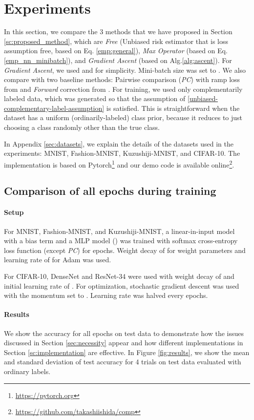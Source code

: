 \documentclass{article}
\begin{document}
\section{Experiments}
\label{sc:experiments}
In this section, we compare the 3 methods that we have proposed in Section \ref{sc:proposed_method}, which are \emph{Free} (Unbiased risk estimator that is loss assumption free, based on Eq. \eqref{emp:general}), \emph{Max Operator} (based on Eq. \eqref{emp_nn_minibatch}), and \emph{Gradient Ascent} (based on Alg.\ref{alg:ascent}).
For \emph{Gradient Ascent}, we used  and  for simplicity.
Mini-batch size was set to .
We also compare with two baseline methods: Pairwise comparison (\emph{PC}) with ramp loss from \citet{ishida17nips} and \emph{Forward} correction from \citet{yu17eccv}.
For training, we used only complementarily labeled data, which was generated so that the assumption of \eqref{unbiased-complementary-label-assumption} is satisfied.
This is straightforward when the dataset has a uniform (ordinarily-labeled) class prior, because it reduces to just choosing a class randomly other than the true class.

In Appendix \ref{sec:datasets}, we explain the details of the datasets used in the experiments: MNIST, Fashion-MNIST, Kuzushiji-MNIST, and CIFAR-10.
The implementation is based on Pytorch\footnote{\url{https://pytorch.org}} and our demo code is available online\footnote{\url{https://github.com/takashiishida/comp}}.

\subsection{Comparison of all epochs during training}
\label{sec:all_epochs_exp}
\paragraph{Setup}
For MNIST, Fashion-MNIST, and Kuzushiji-MNIST, a linear-in-input model with a bias term and a MLP model () was trained with softmax cross-entropy loss function (except \emph{PC}) for  epochs.
Weight decay of  for weight parameters and learning rate of  for Adam \citep{kingma15iclr} was used.

For CIFAR-10, DenseNet \citep{huang2017cvpr} and ResNet-34 \citep{he2016cvpr} were used with weight decay of  and initial learning rate of .  For optimization, stochastic gradient descent was used with the momentum set to .  Learning rate was halved every  epochs.

\paragraph{Results}
We show the accuracy for all  epochs on test data to demonstrate how the issues discussed in Section \ref{sec:necessity} appear and how different implementations in Section \ref{sc:implementation} are effective. In Figure \ref{fig:results}, we show the mean and standard deviation of test accuracy for 4 trials on test data evaluated with ordinary labels.
\end{document}
